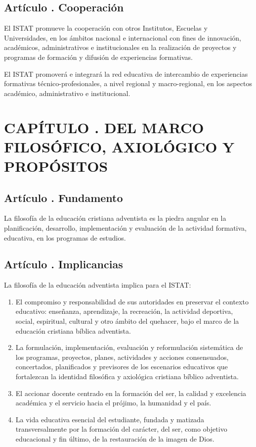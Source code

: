 \subsection{Artículo . Cooperación}
\addtocounter{ns}{1}
El ISTAT promueve la cooperación con otros Institutos, Escuelas y Universidades, en los ámbitos nacional e internacional con fines de innovación, académicos, administrativos e institucionales en la realización de proyectos y programas de formación y difusión de experiencias formativas. 
 
El ISTAT promoverá e integrará la red educativa de intercambio de experiencias formativas técnico-profesionales, a nivel regional y macro-regional, en los aspectos académico, administrativo e institucional.
\section{CAPÍTULO . DEL MARCO FILOSÓFICO, AXIOLÓGICO Y PROPÓSITOS }
\addtocounter{re}{1}
\subsection{Artículo . Fundamento}
\addtocounter{ns}{1}
La filosofía de la educación cristiana adventista es la piedra angular en la planificación, desarrollo, implementación y evaluación de la actividad formativa, educativa, en los programas de estudios. 
\subsection{Artículo . Implicancias}
\addtocounter{ns}{1}
La filosofía de la educación adventista implica para el ISTAT: 
\begin{enumerate}
\item El compromiso y responsabilidad de sus autoridades en preservar el contexto educativo: enseñanza, aprendizaje, la recreación, la actividad deportiva, social, espiritual, cultural y otro ámbito del quehacer, bajo el marco de la educación cristiana bíblica adventista. 
\item La formulación, implementación, evaluación y reformulación sistemática de los programas, proyectos, planes, actividades y acciones consensuados, concertados, planificados y previsores de los escenarios educativos que fortalezcan la identidad filosófica y axiológica cristiana bíblico adventista. 
\item El accionar docente centrado en la formación del ser, la calidad y excelencia académica y el servicio hacia el prójimo, la humanidad y el país. 
\item La vida educativa esencial del estudiante, fundada y matizada transversalmente por la formación del carácter, del ser, como objetivo educacional y fin último, de la restauración de la imagen de Dios. 

\end{enumerate}
